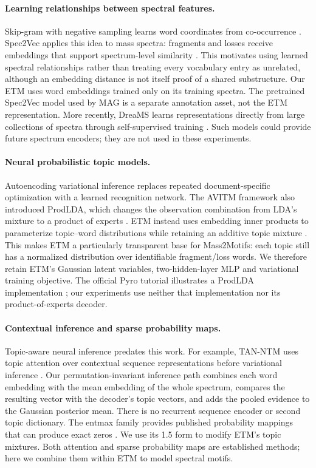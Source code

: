 \documentclass[10pt,a4paper]{article}
\begin{document}
\paragraph{Learning relationships between spectral features.}
Skip-gram with negative sampling learns word coordinates from co-occurrence
\cite{mikolov2013}. Spec2Vec applies this idea to mass spectra: fragments
and losses receive embeddings that support spectrum-level similarity
\cite{huber2021}. This motivates using learned spectral relationships rather
than treating every vocabulary entry as unrelated, although an embedding
distance is not itself proof of a shared substructure. Our ETM uses word
embeddings trained only on its training spectra. The pretrained Spec2Vec
model used by MAG is a separate annotation asset, not the ETM representation.
More recently, DreaMS learns representations directly from large collections
of spectra through self-supervised training \cite{bushuiev2026}. Such models
could provide future spectrum encoders; they are not used in these experiments.

\paragraph{Neural probabilistic topic models.}
Autoencoding variational inference replaces repeated document-specific
optimization with a learned recognition network. The AVITM framework also
introduced ProdLDA, which changes the observation combination from LDA's
mixture to a product of experts \cite{srivastava2017}. ETM instead uses
embedding inner products to parameterize topic--word distributions while
retaining an additive topic mixture \cite{dieng2020}. This makes ETM a
particularly transparent base for Mass2Motifs: each topic still has a
normalized distribution over identifiable fragment/loss words. We therefore
retain ETM's Gaussian latent variables, two-hidden-layer MLP and variational
training objective. The official Pyro tutorial illustrates a ProdLDA
implementation \cite{pyroprodlda}; our experiments use neither that implementation
nor its product-of-experts decoder.

\paragraph{Contextual inference and sparse probability maps.}
Topic-aware neural inference predates this work. For example, TAN-NTM uses
topic attention over contextual sequence representations before variational
inference \cite{panwar2021}. Our permutation-invariant inference path combines
each word embedding with the mean embedding of the whole spectrum, compares
the resulting vector with the decoder's topic vectors, and adds the pooled
evidence to the Gaussian posterior mean.
There is no recurrent sequence encoder or second topic dictionary.
The entmax family provides published probability mappings that can produce
exact zeros \cite{peters2019}. We use its 1.5 form to modify ETM's topic
mixtures. Both attention and sparse probability maps are established methods;
here we combine them within ETM to model spectral motifs.
\end{document}

